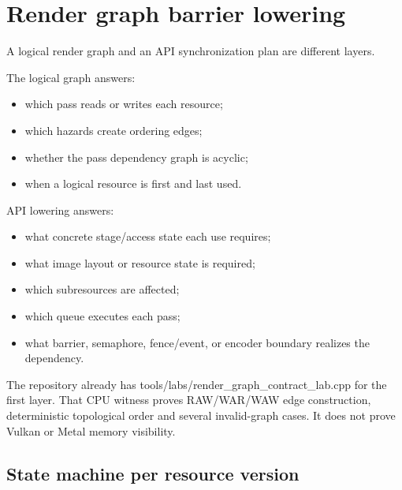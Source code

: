 \hypertarget{appendix-0fc95374cb7e}{}\label{referencestart:appendix-0fc95374cb7e}
\section{Render graph barrier lowering}\label{appendix-0fc95374cb7e-render-graph-barrier-lowering}

\hypertarget{appendix-0fc95374cb7e-render-graph-barrier-lowering}{}

A logical render graph and an API synchronization plan are different layers.

The logical graph answers:

\begin{itemize}
\tightlist
\item
  which pass reads or writes each resource;
\item
  which hazards create ordering edges;
\item
  whether the pass dependency graph is acyclic;
\item
  when a logical resource is first and last used.
\end{itemize}

API lowering answers:

\begin{itemize}
\tightlist
\item
  what concrete stage/access state each use requires;
\item
  what image layout or resource state is required;
\item
  which subresources are affected;
\item
  which queue executes each pass;
\item
  what barrier, semaphore, fence/event, or encoder boundary realizes the dependency.
\end{itemize}

The repository already has tools/labs/render\_graph\_contract\_lab.cpp for the first layer. That CPU witness proves RAW/WAR/WAW edge construction, deterministic topological order and several invalid-graph cases. It does not prove Vulkan or Metal memory visibility.

\subsection{State machine per resource version}\label{appendix-0fc95374cb7e-state-machine-per-resource-version}

\hypertarget{appendix-0fc95374cb7e-state-machine-per-resource-version}{}

